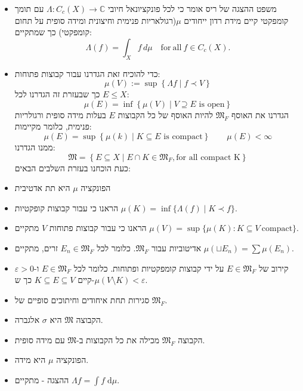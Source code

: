 \documentclass{tstextbook}
\begin{document}
\begin{summary}
  \begin{itemize}
    \item משפט ההצגה של ריס אומר כי לכל פונקציונאל חיובי \(\Lambda:C_{c}(X)\to \mathbb{C}\) עם תומך קומפקטי קיים מידת רדון ייחודים \(\mu\)(רגולאריות פנימית וחיצונית ומידה סופית על תחום קומפקטי) כך שמתקיים:
$$\Lambda(f)=\int_{X}f\,d\mu\quad\mathrm{for~all~}f\in C_{c}(X).$$
    \item כדי להוכיח זאת הגדרנו עבור קבוצות פתוחות:
$$\mu(V):= \sup \left\{  \Lambda f\mid f\prec V  \right\}$$
כך שבעזרת זה הגדרנו לכל \(E \leq X\):
$$\mu(E)=\inf \left\{   \mu(V)\mid V\supseteq E \text{ is open}    \right\}$$
הגדרנו את האוסף \(\mathfrak{M}_{F}\) להיות האוסף של כל הקבוצות \(E\) בעלות מידה סופית ורגולריות פנימית, כלומר מקיימות:
$$\mu(E)=\sup \left\{  \mu(k)\mid K \subseteq E \text{ is compact}  \right\}\qquad \mu(E)<\infty$$
ממנו הגדרנו:
$$\mathfrak{M} =\left\{  E\subseteq X \mid E\cap K \in \mathfrak{M} _{F}, \text{for all compact K}  \right\}$$
כעת הוכחנו בעזרת השלבים הבאים:


    \item הפונקציה \(\mu\) היא תת אדטיבית 


    \item הראנו כי עבור קבוצות קופקטיות \(\mu(K)=\operatorname*{inf}\{\Lambda(f)\mid K\prec f\}\). 


    \item הראנו כי עבור קבוצות פתוחות \(V\) מתקיים \(\mu(V)=\operatorname*{sup}\{\mu(K):K\subseteq V\ \mathrm{compact}\}\). 


    \item אדיטוביות עבור \(\mathfrak{M}_{F}\). כלומר לכל \(E_{n}\in \mathfrak{M}_{F}\) זרים, מתקיים \(\mu\left( \sqcup E_{n}\right)=\sum\mu(E_{n})\). 


    \item קירוב של \(E \in \mathfrak{M}_{F}\) על ידי קבוצות קומפקטיות ופתוחות. כלומר לכל \(E \in \mathfrak{M}_{F}\) ו-\(\varepsilon> 0\) קיים \(K \subseteq E \subseteq V\) כך ש-\(\mu\left( V\setminus K \right)< \varepsilon\). 


    \item סגירות תחת איחודים וחיתוכים סופיים של \(\mathfrak{M}_{F}\). 


    \item הקבוצה \(\mathfrak{M}\) היא \(\sigma\) אלגברה. 


    \item הקבוצה \(\mathfrak{M}_{F}\) מכילה את כל הקבוצות ב-\(\mathfrak{M}\) עם מידה סופית. 


    \item הפונקציה \(\mu\) היא מידה. 


    \item ההצגה - מתקיים \(\Lambda f=\int f \;\mathrm{d} \mu\). 


  \end{itemize}
\end{summary}
\end{document}
